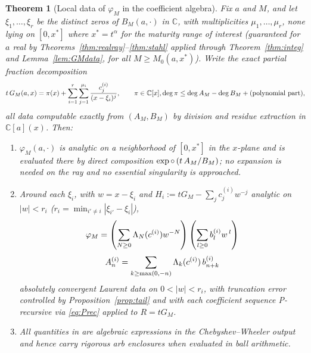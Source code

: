 \documentclass{article}
\newcommand{\assign}{:=}
\newcommand{\tmem}[1]{{\em #1\/}}
\newcommand{\tmtextup}[1]{\text{{\upshape{#1}}}}
\newtheorem{theorem}{Theorem}
\newcommand{\C}{\mathbb{C}}
\begin{document}
\begin{theorem}
  [Local data of $\varphi_M$ in the coefficient algebra]\label{thm:localdata}
  Fix $a$ and $M$, and let $\xi_1, \ldots, \xi_r$ be the distinct zeros of
  $B_M  (a, \cdot)$ in $\C$, with multiplicities $\mu_1, \ldots, \mu_r$, none
  lying on $[0, x^{\ast}]$ where $x^{\ast} = t^{\alpha}$ for the maturity
  range of interest {\tmem{(guaranteed for $a$ real by
  Theorems~\ref{thm:realray}--\ref{thm:stahl} applied through
  Theorem~\ref{thm:integ} and Lemma~\ref{lem:GMdata}, for all $M \ge M_0 (a,
  x^{\ast})$)}}. Write the
  exact partial fraction decomposition
  \[ t \hspace{0.17em} G_M (a, x) = \pi (x) + \sum_{i = 1}^r \sum_{j =
     1}^{\mu_i} \frac{c^{(i)}_j}{(x - \xi_i)^j}, \qquad \pi \in \C [x], \deg
     \pi \le \deg A_M - \deg B_M + \text{(polynomial part)}, \]
  all data computable exactly from $(A_M, B_M)$ by division and residue
  extraction in $\C [a] (x)$. Then:
  \begin{enumerate}
    \item $\varphi_M (a, \cdot)$ is analytic on a neighborhood of $[0,
    x^{\ast}]$ in the $x$-plane and is evaluated there by direct composition
    $\exp \circ \hspace{0.17em} (t \hspace{0.17em} A_M / B_M)$; no expansion
    is needed on the ray and no essential singularity is approached.
    
    \item Around each $\xi_i$, with $w = x - \xi_i$ and $H_i \assign tG_M -
    \sum_j c^{(i)}_j w^{- j}$ analytic on $|w| < r_i$ ($r_i = \min_{i' \ne i}
    | \xi_{i'} - \xi_i |$),
    \begin{equation}
      \varphi_M = \left( \sum_{N \ge 0} \Lambda_N (c^{(i)}) w^{- N} \right)
      \left( \sum_{l \ge 0} b^{(i)}_l w^{\hspace{0.17em} l} \right)
    \end{equation}
    \begin{equation}
      A^{(i)}_n = \sum_{k \ge \max (0, - n)} \Lambda_k (c^{(i)}) 
      \hspace{0.17em} b^{(i)}_{n + k}
    \end{equation}
    absolutely convergent Laurent data on $0 < |w| < r_i$, with truncation
    error controlled by Proposition~\ref{prop:tail} and with each coefficient
    sequence P-recursive via \eqref{eq:Prec} applied to $R = tG_M$.
    
    \item All quantities in \tmtextup{(i)--(ii)} are algebraic expressions in
    the Chebyshev--Wheeler output and hence carry rigorous arb enclosures when
    evaluated in ball arithmetic.
  \end{enumerate}
\end{theorem}
\end{document}
